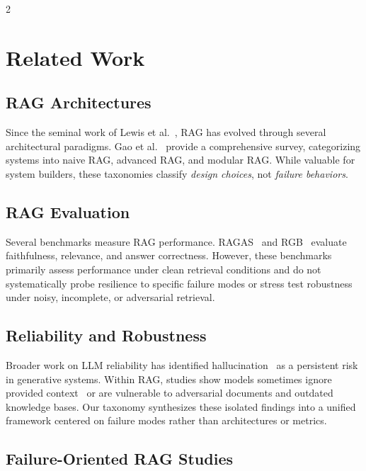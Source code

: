 \documentclass[11pt,a4paper]{article}
\begin{document}
\begin{multicols}{2}
\section{Related Work}
\label{sec:related}

\subsection{RAG Architectures}

Since the seminal work of Lewis et al.~\cite{lewis2020rag}, RAG has evolved through several architectural paradigms. Gao et al.~\cite{gao2023ragsurvey} provide a comprehensive survey, categorizing systems into naive RAG, advanced RAG, and modular RAG. While valuable for system builders, these taxonomies classify \textit{design choices}, not \textit{failure behaviors}.

\subsection{RAG Evaluation}

Several benchmarks measure RAG performance. RAGAS~\cite{ragas2024} and RGB~\cite{rgb2024} evaluate faithfulness, relevance, and answer correctness. However, these benchmarks primarily assess performance under clean retrieval conditions and do not systematically probe resilience to specific failure modes or stress test robustness under noisy, incomplete, or adversarial retrieval.

\subsection{Reliability and Robustness}

Broader work on LLM reliability has identified hallucination~\cite{ji2023hallucination} as a persistent risk in generative systems. Within RAG, studies show models sometimes ignore provided context~\cite{liu2024lost} or are vulnerable to adversarial documents and outdated knowledge bases. Our taxonomy synthesizes these isolated findings into a unified framework centered on failure modes rather than architectures or metrics.

\subsection{Failure-Oriented RAG Studies}


\end{multicols}
\end{document}
